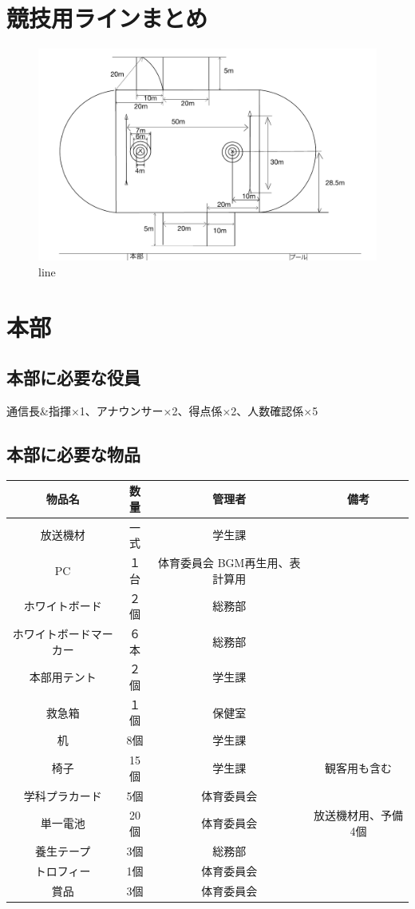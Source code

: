 \documentclass[titlepage]{jarticle}
\begin{document}
\section*{競技用ラインまとめ}
   \begin{figure}[H]
    \centering
    \includegraphics[width=12cm]{line.pdf}
    \caption{line}
   \end{figure}
 \clearpage
 \section{本部}
  \subsection{本部に必要な役員}
   通信長\&指揮×1、アナウンサー×2、得点係×2、人数確認係×5
  \subsection{本部に必要な物品}
\begin{table}[H]
\begin{tabular}{cccc}
     物品名&数量&管理者&備考\\ \hline\hline
 放送機材        & 一式  & 学生課              &  \\
 PC          & １台  & 体育委員会  BGM再生用、表計算用 &  \\
 ホワイトボード     & ２個  & 総務部                &  \\
 ホワイトボードマーカー & ６本  & 総務部                &  \\
 本部用テント      & ２個  & 学生課            &  \\
 救急箱         & １個  & 保健室              &  \\
 机           & 8個  & 学生課               &  \\
 椅子          & 15個 & 学生課   & 観客用も含む        \\
 学科プラカード     & 5個  & 体育委員会 &               \\
 単一電池        & 20個 & 体育委員会 & 放送機材用、予備4個    \\
 養生テープ       & 3個  & 総務部   &               \\
 トロフィー       & 1個  & 体育委員会 &               \\
 賞品          & 3個  & 体育委員会 &              
\end{tabular}
\end{table}
\end{document}
